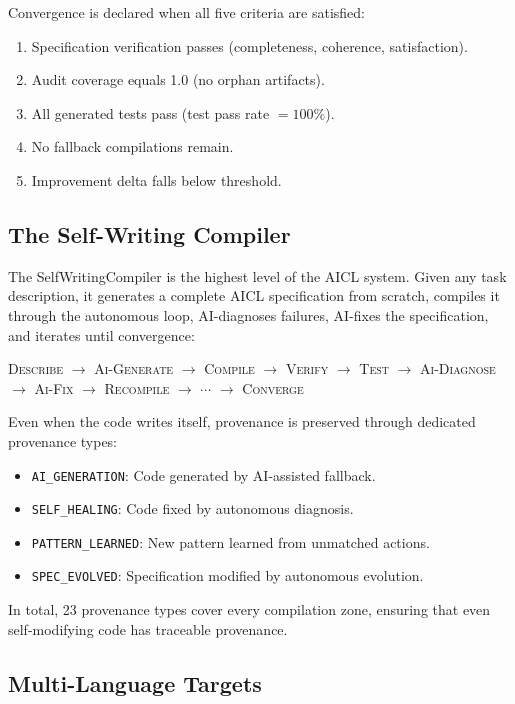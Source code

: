\documentclass[11pt]{article}
\newcommand{\aicl}{\textsc{AICL}}
\begin{document}
Convergence is declared when all five criteria are satisfied:
\begin{enumerate}[leftmargin=*,itemsep=2pt]
  \item Specification verification passes (completeness, coherence, satisfaction).
  \item Audit coverage equals 1.0 (no orphan artifacts).
  \item All generated tests pass (test pass rate $= 100\%$).
  \item No fallback compilations remain.
  \item Improvement delta falls below threshold.
\end{enumerate}

\subsection{The Self-Writing Compiler}
\label{sec:aicl:selfwriting}

The SelfWritingCompiler is the highest level of the \aicl{} system. Given any task description, it generates a complete \aicl{} specification from scratch, compiles it through the autonomous loop, AI-diagnoses failures, AI-fixes the specification, and iterates until convergence:

\begin{center}
\textsc{Describe} $\to$ \textsc{Ai-Generate} $\to$ \textsc{Compile} $\to$ \textsc{Verify} $\to$ \textsc{Test} $\to$ \textsc{Ai-Diagnose} $\to$ \textsc{Ai-Fix} $\to$ \textsc{Recompile} $\to$ $\cdots$ $\to$ \textsc{Converge}
\end{center}

Even when the code writes itself, provenance is preserved through dedicated provenance types:
\begin{itemize}[leftmargin=*,itemsep=1pt]
  \item \texttt{AI\_GENERATION}: Code generated by AI-assisted fallback.
  \item \texttt{SELF\_HEALING}: Code fixed by autonomous diagnosis.
  \item \texttt{PATTERN\_LEARNED}: New pattern learned from unmatched actions.
  \item \texttt{SPEC\_EVOLVED}: Specification modified by autonomous evolution.
\end{itemize}

In total, 23 provenance types cover every compilation zone, ensuring that even self-modifying code has traceable provenance.

\subsection{Multi-Language Targets}
\label{sec:aicl:multilang}
\end{document}
